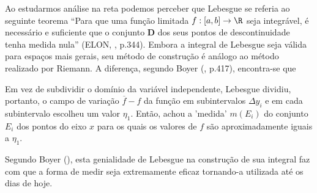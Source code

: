     Ao estudarmos análise na reta podemos perceber que Lebesgue se referia ao seguinte teorema 
    \enquote{Para que uma função limitada $f: [a,b] \to \R$ seja integrável, é necessário e suficiente que o conjunto \textbf{D} dos seus pontos de descontinuidade tenha medida nula} (ELON, \citeyear{Elon}, p.344).
    Embora a integral de Lebesgue seja válida para espaços mais gerais, seu método de construção é análogo ao método realizado por Riemann.
    A diferença, segundo Boyer (\citeyear{Boy}, p.417), encontra-se que 
    
    \begin{citlon}
        Em vez de subdividir o domínio da variável independente, Lebesgue dividiu, portanto, o campo de variação $\overline{f} - f$ da função em subintervalos 
        $\Delta y_i$ e em cada subintervalo escolheu um valor $\eta_1$. 
        Então, achou a 'medida' $m(E_i)$ do conjunto $E_i$ dos pontos do eixo $x$ para os quais os valores de $f$ são aproximadamente iguais a $\eta_1$.
    \end{citlon}
    
    Segundo Boyer (\citeyear{Boy}), esta genialidade de Lebesgue na construção de sua integral faz com que a forma de medir seja extremamente eficaz tornando-a utilizada até os dias de hoje.
 
 
 
 
 
 
 
 
 